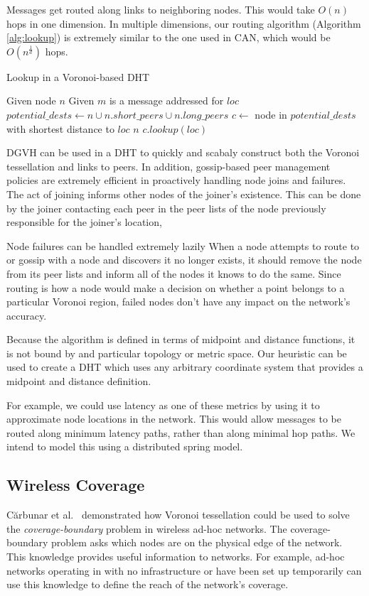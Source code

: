 \documentclass[11pt, conference, letterpaper]{IEEEtran}
\begin{document}
Messages get routed along links to neighboring nodes. 
This would take $O(n)$ hops in one dimension.
In multiple dimensions, our routing algorithm (Algorithm \ref{alg:lookup}) is extremely similar to the one used in CAN, which would be $O(n^{\frac{1}{d}})$ hops.
\begin{algorithm}
	\caption{Lookup in a Voronoi-based DHT}
	\label{alg:lookup}
	\begin{algorithmic}[1] 
		\STATE Given node $n$
		\STATE Given $m$ is a message addressed for $loc$
		\STATE $potential\_dests \leftarrow n \cup n.short\_peers \cup n.long\_peers$
		\STATE $c \leftarrow $ node in $ potential\_dests$ with shortest distance to $loc$
		\RETURN $n$
		\ELSE
		\RETURN $c.lookup(loc)$
		\ENDIF
	\end{algorithmic}
\end{algorithm}

DGVH can be used in a DHT to quickly and scabaly construct both the Voronoi tessellation and links to peers.
In addition, gossip-based peer management policies are extremely efficient in proactively handling node joins and failures.
The act of joining informs other nodes of the joiner's existence.
This can be done by the joiner contacting each peer in the peer lists of the node previously responsible for the joiner's location, 

Node failures can be handled extremely lazily
When a node attempts to route to or gossip with a node and discovers it no longer exists, it should remove the node from its peer lists and inform all of the nodes it knows to do the same.
Since routing is how a node would make a decision on whether a point belongs to a particular Voronoi region, failed nodes don't have any impact on the network's accuracy.


Because the algorithm is defined in terms of midpoint and distance functions, it is not bound by and particular topology or metric space.
Our heuristic can be used to create a DHT which uses any arbitrary coordinate system that provides a midpoint and distance definition.

For example, we could use latency as one of these metrics by using it to approximate node locations in the network.
This would allow messages to be routed along minimum latency paths, rather than along minimal hop paths.
We intend to model this using a distributed spring model.


\subsection{Wireless Coverage}
C\u{a}rbunar et al.\ \cite{carbunar2004distributed} demonstrated how Voronoi tessellation could be used to solve the \textit{coverage-boundary} problem in wireless ad-hoc networks.
The coverage-boundary problem asks which nodes are on the physical edge of the network.
This knowledge provides useful information to networks.
For example, ad-hoc networks operating in with no infrastructure or have been set up temporarily can use this knowledge to define the reach of the network's coverage.
\end{document}
